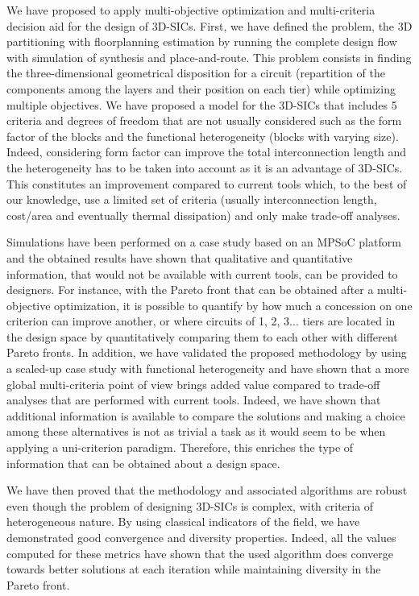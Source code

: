 We have proposed to apply multi-objective optimization and multi-criteria decision aid for the design of 3D-SICs. First, we have defined the problem, the 3D partitioning with floorplanning estimation by running the complete design flow with simulation of synthesis and place-and-route. This problem consists in finding the three-dimensional geometrical disposition for a circuit (repartition of the components among the layers and their position on each tier) while optimizing multiple objectives. We have proposed a model for the 3D-SICs that includes 5 criteria and degrees of freedom that are not usually considered such as the form factor of the blocks and the functional heterogeneity (blocks with varying size). Indeed, considering form factor can improve the total interconnection length and the heterogeneity has to be taken into account as it is an advantage of 3D-SICs. This constitutes an improvement compared to current tools which, to the best of our knowledge, use a limited set of criteria (usually interconnection length, cost/area and eventually thermal dissipation) and only make trade-off analyses.

Simulations have been performed on a case study based on an MPSoC platform and the obtained results have shown that qualitative and quantitative information, that would not be available with current tools, can be provided to designers. For instance, with the Pareto front that can be obtained after a multi-objective optimization, it is possible to quantify by how much a concession on one criterion can improve another, or where circuits of 1, 2, 3... tiers are located in the design space by quantitatively comparing them to each other with different Pareto fronts. In addition, we have validated the proposed methodology by using a scaled-up case study with functional heterogeneity and have shown that a more global multi-criteria point of view brings added value compared to trade-off analyses that are performed with current tools. Indeed, we have shown that additional information is available to compare the solutions and making a choice among these alternatives is not as trivial a task as it would seem to be when applying a uni-criterion paradigm. Therefore, this enriches the type of information that can be obtained about a design space.

We have then proved that the methodology and associated algorithms are robust even though the problem of designing 3D-SICs is complex, with criteria of heterogeneous nature. By using classical indicators of the field, we have demonstrated good convergence and diversity properties. Indeed, all the values computed for these metrics have shown that the used algorithm does converge towards better solutions at each iteration while maintaining diversity in the Pareto front.

